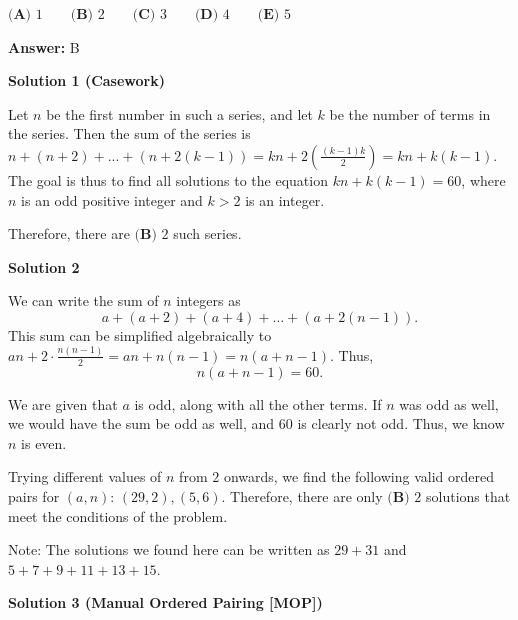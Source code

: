 \begin{enumerate}
 $\textbf{(A) } 1\qquad\textbf{(B) } 2\qquad\textbf{(C) } 3\qquad\textbf{(D) } 4\qquad\textbf{(E) } 5$

 \textbf{Answer: }B



\textbf{Solution 1 (Casework)}

Let $n$ be the first number in such a series, and let $k$ be the number of terms in the series.  Then the sum of the series is $n + (n+2) + ... + (n+2(k-1)) = kn + 2\left(\frac{(k-1)k}{2}\right) = kn + k(k-1)$.  The goal is thus to find all solutions to the equation $kn + k(k-1) = 60$, where $n$ is an odd positive integer and $k > 2$ is an integer.

 


 Therefore, there are $\boxed{\textbf{(B) }2}$ such series.

 



\textbf{Solution 2}

We can write the sum of $n$ integers as 
 \[a + (a + 2) + (a + 4) + \dots + (a + 2(n-1)).\] This sum can be simplified algebraically to $an + 2 \cdot \frac{n(n-1)}{2} = an + n(n-1) = n(a + n - 1)$. Thus, 
 \[n(a + n - 1) = 60.\]

 We are given that $a$ is odd, along with all the other terms. If $n$ was odd as well, we would have the sum be odd as well, and $60$ is clearly not odd. Thus, we know $n$ is even.

 Trying different values of $n$ from $2$ onwards, we find the following valid ordered pairs for $(a, n)$: $(29, 2), (5, 6)$. Therefore, there are only $\boxed{\textbf{(B) } 2}$ solutions that meet the conditions of the problem.

 Note: The solutions we found here can be written as $29 + 31$ and $5 + 7 + 9 + 11 + 13 + 15$.

 



\textbf{Solution 3 (Manual Ordered Pairing [MOP])}


\end{enumerate}
